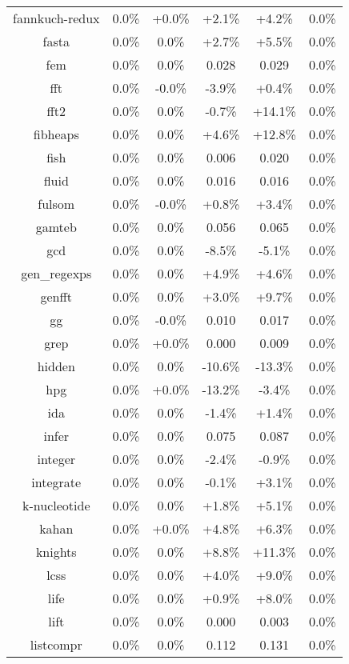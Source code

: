 \begin{tabular}{ c c c c c c }
fannkuch-redux &  0.0\% & +0.0\% & +2.1\% & +4.2\% &  0.0\%\\
fasta &  0.0\% &  0.0\% & +2.7\% & +5.5\% &  0.0\%\\
fem &  0.0\% &  0.0\% & 0.028 & 0.029 &  0.0\%\\
fft &  0.0\% & -0.0\% & -3.9\% & +0.4\% &  0.0\%\\
fft2 &  0.0\% &  0.0\% & -0.7\% & +14.1\% &  0.0\%\\
fibheaps &  0.0\% &  0.0\% & +4.6\% & +12.8\% &  0.0\%\\
fish &  0.0\% &  0.0\% & 0.006 & 0.020 &  0.0\%\\
fluid &  0.0\% &  0.0\% & 0.016 & 0.016 &  0.0\%\\
fulsom &  0.0\% & -0.0\% & +0.8\% & +3.4\% &  0.0\%\\
gamteb &  0.0\% &  0.0\% & 0.056 & 0.065 &  0.0\%\\
gcd &  0.0\% &  0.0\% & -8.5\% & -5.1\% &  0.0\%\\
gen\_regexps &  0.0\% &  0.0\% & +4.9\% & +4.6\% &  0.0\%\\
genfft &  0.0\% &  0.0\% & +3.0\% & +9.7\% &  0.0\%\\
gg &  0.0\% & -0.0\% & 0.010 & 0.017 &  0.0\%\\
grep &  0.0\% & +0.0\% & 0.000 & 0.009 &  0.0\%\\
hidden &  0.0\% &  0.0\% & -10.6\% & -13.3\% &  0.0\%\\
hpg &  0.0\% & +0.0\% & -13.2\% & -3.4\% &  0.0\%\\
ida &  0.0\% &  0.0\% & -1.4\% & +1.4\% &  0.0\%\\
infer &  0.0\% &  0.0\% & 0.075 & 0.087 &  0.0\%\\
integer &  0.0\% &  0.0\% & -2.4\% & -0.9\% &  0.0\%\\
integrate &  0.0\% &  0.0\% & -0.1\% & +3.1\% &  0.0\%\\
k-nucleotide &  0.0\% &  0.0\% & +1.8\% & +5.1\% &  0.0\%\\
kahan &  0.0\% & +0.0\% & +4.8\% & +6.3\% &  0.0\%\\
knights &  0.0\% &  0.0\% & +8.8\% & +11.3\% &  0.0\%\\
lcss &  0.0\% &  0.0\% & +4.0\% & +9.0\% &  0.0\%\\
life &  0.0\% &  0.0\% & +0.9\% & +8.0\% &  0.0\%\\
lift &  0.0\% &  0.0\% & 0.000 & 0.003 &  0.0\%\\
listcompr &  0.0\% &  0.0\% & 0.112 & 0.131 &  0.0\%\\

\end{tabular}
